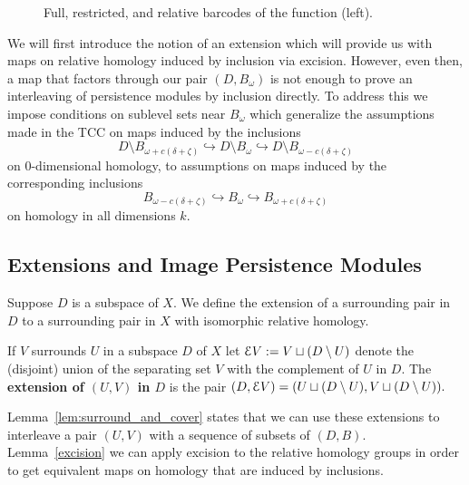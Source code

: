\begin{figure}[htbp]
\begin{minipage}[b]{0.7\textwidth}
  \end{minipage}
  \caption{Full, restricted, and relative barcodes of the function (left).}%
\end{figure}

We will first introduce the notion of an extension which will provide us with maps on relative homology induced by inclusion via excision.
However, even then, a map that factors through our pair $(D, B_\omega)$ is not enough to prove an interleaving of persistence modules by inclusion directly.
To address this we impose conditions on sublevel sets near $B_\omega$ which generalize the assumptions made in the TCC on maps induced by the inclusions
\[ D\setminus B_{\omega+c(\delta+\zeta)}\hookrightarrow D\setminus B_\omega\hookrightarrow D\setminus B_{\omega-c(\delta+\zeta)}\]
on $0$-dimensional homology, to assumptions on maps induced by the corresponding inclusions
\[ B_{\omega-c(\delta+\zeta)}\hookrightarrow B_\omega\hookrightarrow B_{\omega+c(\delta+\zeta)}\]
on homology in all dimensions $k$.

\subsection{Extensions and Image Persistence Modules}

Suppose $D$ is a subspace of $X$.
We define the extension of a surrounding pair in $D$ to a surrounding pair in $X$ with isomorphic relative homology.

\begin{definition}[Extension]
  If $V$ surrounds $U$ in a subspace $D$ of $X$ let $\mathcal{E} V := V\sqcup (D\setminus U)$ denote the (disjoint) union of the separating set $V$ with the complement of $U$ in $D$.
  The \textbf{extension of $(U, V)$ in $D$} is the pair $(D, \mathcal{E} V) = (U\sqcup (D\setminus U), V\sqcup (D\setminus U)).$
\end{definition}

Lemma~\ref{lem:surround_and_cover} states that we can use these extensions to interleave a pair $(U, V)$ with a sequence of subsets of $(D, B)$.
Lemma~\ref{excision} we can apply excision to the relative homology groups in order to get equivalent maps on homology that are induced by inclusions.

